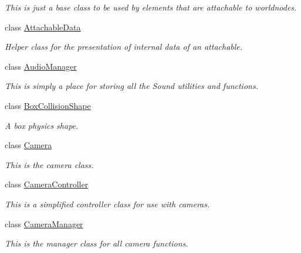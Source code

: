 \begin{DoxyCompactItemize}
\begin{DoxyCompactList}\small\item\em This is just a base class to be used by elements that are attachable to worldnodes. \item\end{DoxyCompactList}\item 
class \hyperlink{structMezzanine_1_1AttachableData}{AttachableData}
\begin{DoxyCompactList}\small\item\em Helper class for the presentation of internal data of an attachable. \item\end{DoxyCompactList}\item 
class \hyperlink{classMezzanine_1_1AudioManager}{AudioManager}
\begin{DoxyCompactList}\small\item\em This is simply a place for storing all the Sound utilities and functions. \item\end{DoxyCompactList}\item 
class \hyperlink{classMezzanine_1_1BoxCollisionShape}{BoxCollisionShape}
\begin{DoxyCompactList}\small\item\em A box physics shape. \item\end{DoxyCompactList}\item 
class \hyperlink{classMezzanine_1_1Camera}{Camera}
\begin{DoxyCompactList}\small\item\em This is the camera class. \item\end{DoxyCompactList}\item 
class \hyperlink{classMezzanine_1_1CameraController}{CameraController}
\begin{DoxyCompactList}\small\item\em This is a simplified controller class for use with cameras. \item\end{DoxyCompactList}\item 
class \hyperlink{classMezzanine_1_1CameraManager}{CameraManager}
\begin{DoxyCompactList}\small\item\em This is the manager class for all camera functions. \item\end{DoxyCompactList}\item 

\end{DoxyCompactItemize}
